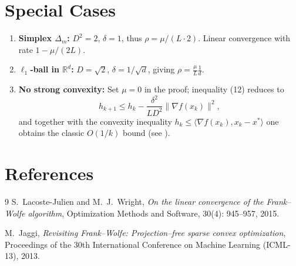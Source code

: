 \documentclass{article}
\newcommand{\R}{\mathbb{R}}
\newcommand{\inner}[2]{\langle #1,#2\rangle}
\begin{document}
\section*{Special Cases}
\begin{enumerate}
\item \textbf{Simplex $\Delta_{m}$:} $D^{2}=2$, $\delta=1$, thus $\rho=\mu/(L\cdot2)$. Linear convergence with rate $1-\mu/(2L)$.
\item \textbf{$\ell_{1}$‑ball in $\R^{d}$:} $D=\sqrt{2}$, $\delta=1/\sqrt{d}$, giving $\rho=\frac{\mu}{L}\frac{1}{d}$.
\item \textbf{No strong convexity:} Set $\mu=0$ in the proof; inequality (12) reduces to
\[
h_{k+1}\le h_{k} - \frac{\delta^{2}}{L D^{2}}\|\nabla f(x_{k})\|^{2},
\]
and together with the convexity inequality $h_{k}\le \inner{\nabla f(x_{k})}{x_{k}-x^{*}}$ one obtains the classic $O(1/k)$ bound (see \cite{jaggi2013revisiting}).
\end{enumerate}

\section*{References}
\begin{thebibliography}{9}
S.~Lacoste-Julien and M.~J.~Wright, \emph{On the linear convergence of the Frank–Wolfe algorithm}, Optimization Methods and Software, 30(4): 945–957, 2015.

M.~Jaggi, \emph{Revisiting Frank–Wolfe: Projection–free sparse convex optimization}, Proceedings of the 30th International Conference on Machine Learning (ICML-13), 2013.
\end{thebibliography}
\end{document}
